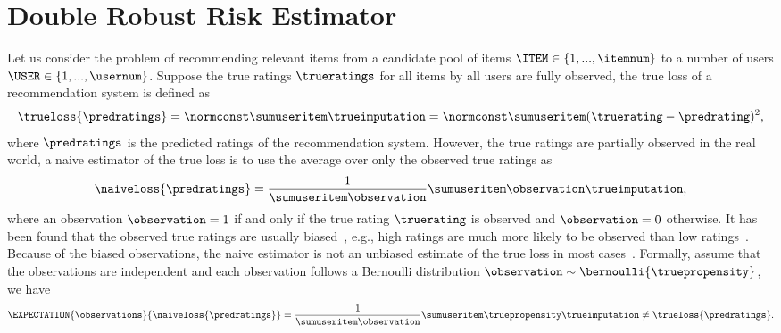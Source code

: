 
\section{Double Robust Risk Estimator} \label{sec:double robust risk estimator}
Let us consider the problem of recommending relevant items from a candidate pool of items $\ITEM\in\{1,...,\itemnum\}$ to a number of users $\USER\in\{1,...,\usernum\}$.
Suppose the true ratings $\trueratings$ for all items by all users  are fully observed, the true loss of a recommendation system is defined as~\cite{koren2009matrix}
\begin{equation}
\label{equ:true loss}
\begin{aligned}
\trueloss{\predratings}
=
\normconst\sumuseritem\trueimputation
=
\normconst\sumuseritem(\truerating-\predrating)^{2}
\text{,}
\end{aligned}
\end{equation}%
where $\predratings$ is the predicted ratings of the recommendation system.
However, the true ratings are partially observed in the real world, a naive estimator of the true loss is to use the average over only the observed true ratings as
\begin{equation}
\begin{aligned}
\naiveloss{\predratings}
=
\frac{1}{\sumuseritem\observation}\sumuseritem\observation\trueimputation
\text{,}
\end{aligned}
\end{equation}%
where an observation $\observation=1$ if and only if the true rating $\truerating$ is observed and $\observation=0$ otherwise.
It has been found that the observed true ratings are usually biased~\cite{marlin2007collaborative}, e.g., high ratings are much more likely to be observed than low ratings~\cite{marlin2009collaborative}.
Because of the biased observations, the naive estimator is not an unbiased estimate of the true loss in most cases~\cite{steck2013evaluation}.
Formally, assume that the observations are independent and each observation follows a Bernoulli distribution $\observation\sim\bernoulli{\truepropensity}$, we have
\begin{equation}
\begin{aligned}
\EXPECTATION{\observations}{\naiveloss{\predratings}}
=
\frac{1}{\sumuseritem\observation}\sumuseritem\truepropensity\trueimputation
\neq
\trueloss{\predratings}
\text{.}
\end{aligned}
\end{equation}%

